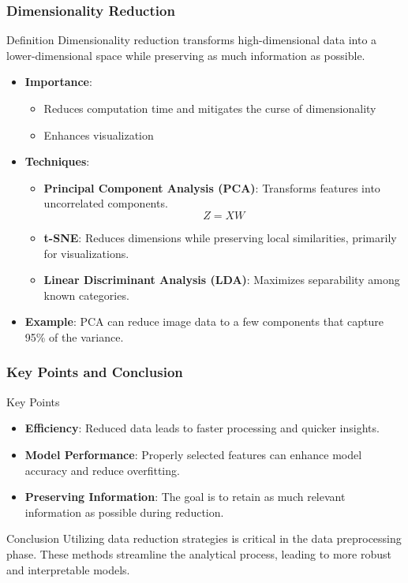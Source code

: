 \documentclass{beamer}
\begin{document}
\begin{frame}[fragile]
    \frametitle{Dimensionality Reduction}
    \begin{block}{Definition}
        Dimensionality reduction transforms high-dimensional data into a lower-dimensional space while preserving as much information as possible.
    \end{block}
    \begin{itemize}
        \item \textbf{Importance}: 
            \begin{itemize}
                \item Reduces computation time and mitigates the curse of dimensionality
                \item Enhances visualization
            \end{itemize}
        \item \textbf{Techniques}:
            \begin{itemize}
                \item \textbf{Principal Component Analysis (PCA)}: Transforms features into uncorrelated components. 
                    \begin{equation}
                    Z = XW
                    \end{equation}
                \item \textbf{t-SNE}: Reduces dimensions while preserving local similarities, primarily for visualizations.
                \item \textbf{Linear Discriminant Analysis (LDA)}: Maximizes separability among known categories.
            \end{itemize}
        \item \textbf{Example}: PCA can reduce image data to a few components that capture 95\% of the variance.
    \end{itemize}
\end{frame}

\begin{frame}[fragile]
    \frametitle{Key Points and Conclusion}
    \begin{block}{Key Points}
        \begin{itemize}
            \item \textbf{Efficiency}: Reduced data leads to faster processing and quicker insights.
            \item \textbf{Model Performance}: Properly selected features can enhance model accuracy and reduce overfitting.
            \item \textbf{Preserving Information}: The goal is to retain as much relevant information as possible during reduction.
        \end{itemize}
    \end{block}
    \begin{block}{Conclusion}
        Utilizing data reduction strategies is critical in the data preprocessing phase. These methods streamline the analytical process, leading to more robust and interpretable models.
    \end{block}
\end{frame}
\end{document}

